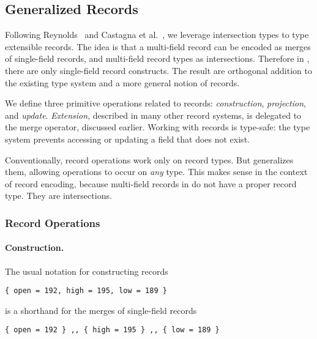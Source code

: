 {%

\subsection{Generalized Records}




Following Reynolds~\cite{reynolds1997design} and Castagna et
al.~\cite{castagna1995calculus}, we leverage intersection types to type
extensible records. The idea is that a multi-field record can be encoded as
merges of single-field records, and multi-field record types as intersections.
Therefore in \name, there are only single-field record constructs. The result
are orthogonal addition to the existing type system and a more general notion of
records. 

We define three primitive operations related to records: \emph{construction},
\emph{projection}, and \emph{update}. \emph{Extension}, described in many other
record systems, is delegated to the merge operator, discussed earlier. Working
with records is type-safe: the type system prevents accessing or updating a
field that does not exist.

Conventionally, record operations work only on record types. But \name
generalizes them, allowing operations to occur on \emph{any} type. This makes
sense in the context of record encoding, because multi-field records in \name do
not have a proper record type. They are intersections.

\subsubsection{Record Operations}

\paragraph{Construction.}
The usual notation for constructing records
\begin{lstlisting}
{ open = 192, high = 195, low = 189 } 
\end{lstlisting}
is a shorthand for the merges of single-field records
\begin{lstlisting}
{ open = 192 } ,, { high = 195 } ,, { low = 189 } 
\end{lstlisting}

}
